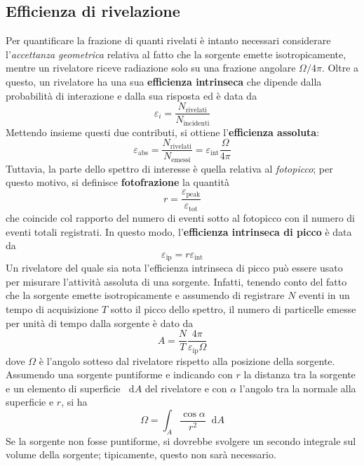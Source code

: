 \documentclass[11pt, a4paper]{scrartcl}
\theoremstyle{style}
\newcommand{\dd}{\mathop{}\!\mathrm{d}}
\numberwithin{equation}{subsection}
\begin{document}
\subsection{Efficienza di rivelazione}
Per quantificare la frazione di quanti rivelati \`e intanto necessari considerare l'\textit{accettanza geometrica} relativa al fatto che la sorgente emette isotropicamente, mentre un rivelatore riceve radiazione solo su una frazione angolare $\Omega / 4\pi$.
Oltre a questo, un rivelatore ha una sua \textbf{efficienza intrinseca} che dipende dalla probabilit\`a di interazione e dalla sua risposta ed \`e data da 
\[
\varepsilon _i = \frac{N_\text{rivelati}}{N_\text{incidenti}}
\] 
Mettendo insieme questi due contributi, si ottiene l'\textbf{efficienza assoluta}:
\begin{equation}
	\varepsilon _\text{abs} = \frac{N_\text{rivelati}}{N_\text{emessi}} = \varepsilon _\text{int} \frac{\Omega }{4\pi}
\end{equation}
Tuttavia, la parte dello spettro di interesse \`e quella relativa al \textit{fotopicco}; per questo motivo, si definisce \textbf{fotofrazione} la quantit\`a
\[
r = \frac{\varepsilon _\text{peak}}{\varepsilon _\text{tot}}
\] 
che coincide col rapporto del numero di eventi sotto al fotopicco con il numero di eventi totali registrati.
In questo modo, l'\textbf{efficienza intrinseca di picco} \`e data da 
\begin{equation}
	\varepsilon _\text{ip}  = r \varepsilon _\text{int}
\end{equation}
Un rivelatore del quale sia nota l'efficienza intrinseca di picco pu\`o essere usato per misurare l'attivit\`a assoluta di una sorgente.
Infatti, tenendo conto del fatto che la sorgente emette isotropicamente e assumendo di registrare $N$ eventi in un tempo di acquisizione $T$ sotto il picco dello spettro, il numero di particelle emesse per unit\`a di tempo dalla sorgente \`e dato da 
\begin{equation}
	A = \frac{N}{T} \frac{4\pi}{\varepsilon _\text{ip}\Omega }
\end{equation}
dove $\Omega $ \`e l'angolo sotteso dal rivelatore rispetto alla posizione della sorgente.
Assumendo una sorgente puntiforme e indicando con $r$ la distanza tra la sorgente e un elemento di superficie $\dd A$ del rivelatore e con $\alpha $ l'angolo tra la normale alla superficie e $r$, si ha
\[
\Omega  = \int _A \frac{\cos \alpha }{r^2}\dd A
\] 
Se la sorgente non fosse puntiforme, si dovrebbe svolgere un secondo integrale sul volume della sorgente; tipicamente, questo non sar\`a necessario.
\end{document}
